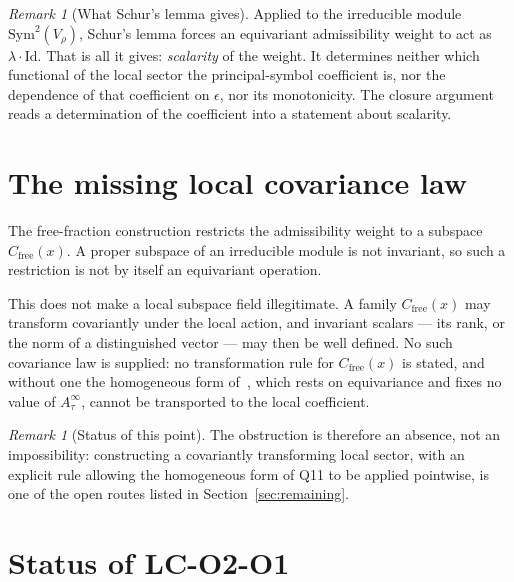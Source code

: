 \documentclass[12pt,a4paper]{article}
\theoremstyle{remark}
\newtheorem{remark}[theorem]{Remark}
\theoremstyle{definition}
\newcommand{\Sym}{\mathrm{Sym}}
\begin{document}
    \begin{remark}[What Schur's lemma gives]
      \label{rem:schur}
      Applied to the irreducible module $\Sym^{2}(V_{\rho})$, Schur's lemma forces an equivariant
      admissibility weight to act as $\lambda\cdot\mathrm{Id}$.
      That is all it gives: \emph{scalarity} of the weight.
      It determines neither which functional of the local sector the principal-symbol coefficient is,
      nor the dependence of that coefficient on $\epsilon$, nor its monotonicity.
      The closure argument reads a determination of the coefficient into a statement about scalarity.
    \end{remark}

  \section{The missing local covariance law}
    \label{sec:covariance}

    The free-fraction construction restricts the admissibility weight to a subspace
    $C_{\mathrm{free}}(x)$.
    A proper subspace of an irreducible module is not invariant, so such a restriction is not by itself
    an equivariant operation.

    This does not make a local subspace field illegitimate.
    A family $C_{\mathrm{free}}(x)$ may transform covariantly under the local action, and invariant
    scalars --- its rank, or the norm of a distinguished vector --- may then be well defined.
    No such covariance law is supplied: no transformation rule for
    $C_{\mathrm{free}}(x)$ is stated, and without one the homogeneous form of~\cite{Beau2026q11}, which rests on
    equivariance and fixes no value of $A_{\tau}^{\infty}$, cannot be transported to the local coefficient.

    \begin{remark}[Status of this point]
      \label{rem:covariance-status}
      The obstruction is therefore an absence, not an impossibility: constructing a covariantly
      transforming local sector, with an explicit rule allowing the homogeneous form of Q11 to be applied
      pointwise, is one of
      the open routes listed in Section~\ref{sec:remaining}.
    \end{remark}

  \section{Status of LC-O2-O1}
    \label{sec:status}
\end{document}
